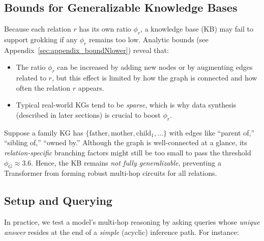     \subsection{Bounds for Generalizable Knowledge Bases}\label{subsec:bounds}
        
        Because each relation \(r\) has its own ratio \(\phi_r\), a knowledge base (KB) may fail to support grokking if any \(\phi_r\) remains too low. Analytic bounds (see Appendix~\ref{sec:appendix_boundNlower}) reveal that:
        \begin{itemize}
            \item The ratio \(\phi_{r}\) can be increased by adding new nodes or by augmenting edges related to \(r\), but this effect is limited by how the graph is connected and how often the relation \(r\) appears.
            \item Typical real-world KGs tend to be \emph{sparse}, which is why data synthesis (described in later sections) is crucial to boost \(\phi_r\).
        \end{itemize}
        
        \begin{example}
            \label{ex:family_example}
            Suppose a family KG has \(\{\text{father},\text{mother},\text{child}_1,\ldots\}\) with edges like ``parent of,'' ``sibling of,'' ``owned by.'' Although the graph is well-connected at a glance, its \emph{relation-specific} branching factors might still be too small to pass the threshold \(\phi_G \approx 3.6\). Hence, the KB remains \emph{not fully generalizable}, preventing a Transformer from forming robust multi-hop circuits for all relations.
        \end{example}
        
    \subsection{Setup and Querying}
        \label{subsec:setup_querying}
        
        In practice, we test a model’s multi-hop reasoning by asking queries whose \emph{unique answer} resides at the end of a \emph{simple} (acyclic) inference path. For instance:
        
